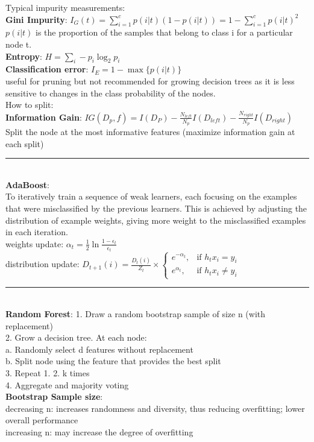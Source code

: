 \documentclass[10pt,landscape]{article}
\newcommand{\ruler}{\\\rule{\columnwidth}{0.25pt}\\}
\begin{document}
\begin{multicols*}{3}
Typical impurity measurements:\\
\textbf{Gini Impurity}: $I_G(t)=\sum^c_{i=1}{p(i|t)(1-p(i|t))} = 1 - \sum_{i=1}^c{p(i|t)^2}$\\
$p(i|t)$ is the proportion of the samples that belong to class i for a particular node t.\\
\textbf{Entropy}: $H = \sum_{i} - p_i\log_{2}p_i$\\
\textbf{Classification error}: $I_E=1-\max\{p(i|t)\}$\\
useful for pruning but not recommended for growing decision trees as it is less sensitive to changes in the class probability of the nodes.\\
How to split:\\
\textbf{Information Gain}: $IG(D_p,f)=I(D_P)-\frac{N_{left}}{N_p}I(D_{left})-\frac{N_{right}}{N_p}I(D_{right})$\\
Split the node at the most informative features (maximize information gain at each split)
\ruler
\textbf{AdaBoost}:\\
To iteratively train a sequence of weak learners, each focusing on the examples that were misclassified by the previous learners. This is achieved by adjusting the distribution of example weights, giving more weight to the misclassified examples in each iteration.\\
weights update: $\alpha_t = \frac{1}{2}\ln \frac{1-\epsilon_t}{\epsilon_t}$\\
distribution update: $D_{t+1}(i)=\frac{D_{t}(i)}{Z_t} \times
\begin{cases}
    e^{-\alpha_t},  & \text{if } h_t{x_i} = y_i\\
    e^{\alpha_t},   & \text{if } h_t{x_i} \neq y_i
\end{cases}
$
\ruler
\textbf{Random Forest}:
1. Draw a random bootstrap sample of size n (with replacement)\\
2. Grow a decision tree. At each node:\\
\-\hspace{0.5cm} a. Randomly select d features without replacement\\
\-\hspace{0.5cm} b. Split node using the feature that provides the best split\\
3. Repeat 1. 2. k times\\
4. Aggregate and majority voting\\

\textbf{Bootstrap Sample size}:\\
decreasing n: increases randomness and diversity, thus reducing overfitting; lower overall performance\\
increasing n: may increase the degree of overfitting\\


\end{multicols*}
\end{document}
